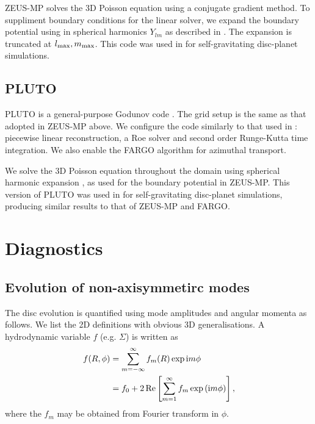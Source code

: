 ZEUS-MP solves the 3D Poisson equation using a conjugate gradient
method. To suppliment boundary conditions for the linear solver, we
expand the boundary potential using in spherical harmonics $Y_{lm}$ 
as described in \cite{boss80}. The expansion is truncated at
$l_\mathrm{max},m_\mathrm{max}$. This code was used in \cite{lin12b} for
self-gravitating disc-planet simulations.  

\subsection{PLUTO} 
PLUTO is a general-purpose Godunov code \citep{mignone07}. The grid
setup is the same as that adopted in ZEUS-MP above. We configure the
code similarly to that used in \cite{lin14}: piecewise linear
reconstruction, a Roe solver and second order Runge-Kutta time
integration. We also enable the FARGO algorithm for azimuthal
transport. 

We solve the 3D Poisson equation throughout the domain using spherical
harmonic expansion \citep{boss80}, as used for the boundary potential
in ZEUS-MP. This version of PLUTO was used in \cite{lin14b} for
self-gravitating disc-planet simulations, producing similar results to
that of ZEUS-MP and FARGO. 


\section{Diagnostics}
 
\subsection{Evolution of non-axisymmetirc modes}
The disc evolution is quantified using mode amplitudes and angular
momenta as follows. We list the 2D definitions with obvious 3D generalisations. 
A hydrodynamic variable $f$ (e.g. $\Sigma$) is written as 
\begin{align}
  f(R,\phi) &= \sum_{m=-\infty}^{\infty}f_m(R)\exp{\mathrm{i}m \phi} \notag\\
  &= f_0 + 2 \operatorname{Re}\left[\sum_{m=1}^\infty f_m \exp{(\mathrm{i}m\phi)}\right], 
\end{align}
where the $f_m$ may be obtained from Fourier transform in $\phi$. 


